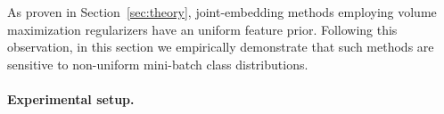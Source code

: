 \documentclass{article} %
\begin{document}
As proven in Section~\ref{sec:theory}, joint-embedding methods employing volume maximization regularizers have an uniform feature prior.
Following this observation, in this section we empirically demonstrate that such methods are sensitive to non-uniform mini-batch class distributions.






\paragraph{Experimental setup.}
\end{document}
